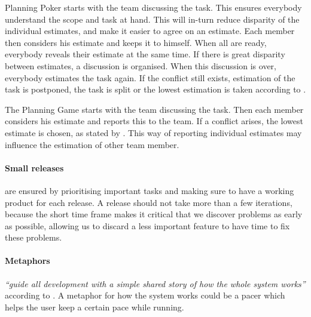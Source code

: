 Planning Poker starts with the team discussing the task. This ensures everybody understand the scope and task at hand. This will in-turn reduce disparity of the individual estimates, and make it easier to agree on an estimate. Each member then considers his estimate and keeps it to himself. When all are ready, everybody reveals their estimate at the same time. If there is great disparity between estimates, a discussion is organised. When this discussion is over, everybody estimates the task again. If the conflict still exists, estimation of the task is postponed, the task is split or the lowest estimation is taken according to \citet[p. 1]{xp:planningPoker}.

The Planning Game starts with the team discussing the task. Then each member considers his estimate and reports this to the team. If a conflict arises, the lowest estimate is chosen, as stated by \citet[p. 58]{xp:planning}.
This way of reporting individual estimates may influence the estimation of other team member. 

\paragraph{Small releases} are ensured by prioritising important tasks and making sure to have a working product for each release. A release should not take more than a few iterations, because the short time frame makes it critical that we discover problems as early as possible, allowing us to discard a less important feature to have time to fix these problems.

\paragraph{Metaphors} \textit{``guide all development with a simple shared story of how the whole system works''} according to \cite[p.54]{xp:planning}. A metaphor for how the system works could be a pacer which helps the user keep a certain pace while running.

